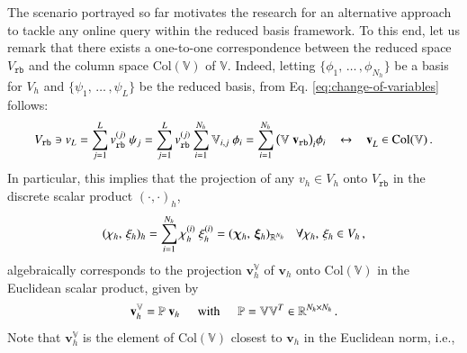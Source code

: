 \documentclass[longtitle]{elsarticle}
\numberwithin{equation}{section}
\theoremstyle{theorem}
\theoremstyle{definition}
\theoremstyle{remark}
\theoremstyle{proposition}
\numberwithin{figure}{section}
\newcommand{\bg}[1]{\boldsymbol{#1}}
\begin{document}
		The scenario portrayed so far motivates the research for an alternative approach to tackle any online query within the reduced basis framework. To this end, let us remark that there exists a one-to-one correspondence between the reduced space $V_{\texttt{rb}}$ and the column space $\text{Col}(\mathbb{V})$ of $\mathbb{V}$. Indeed, letting $\big\lbrace \phi_1, \, \ldots \, , \phi_{N_h} \big\rbrace$ be a basis for $V_h$ and $\big\lbrace \psi_1, \, \ldots \, , \psi_L \big\rbrace$ be the reduced basis, from Eq. \eqref{eq:change-of-variables} follows:
		\begin{equation*}
			V_{\texttt{rb}} \ni v_{L} = \sum_{j = 1}^L v_{\texttt{rb}}^{(j)} ~ \psi_j = \sum_{j = 1}^L v_{\texttt{rb}}^{(j)} \sum_{i = 1}^{N_h} \mathbb{V}_{i,j} ~ \phi_i = \sum_{i = 1}^{N_h} \big( \mathbb{V} ~ \mathbf{v}_{\texttt{rb}} \big)_i \phi_i \hspace*{0.3cm} \leftrightarrow \hspace*{0.3cm} \mathbf{v}_L^{} \in \text{Col}(\mathbb{V}) \, .
		\end{equation*}
		In particular, this implies that the projection of any $v_h \in V_h$ onto $V_{\texttt{rb}}$ in the discrete scalar product $(\cdot,\cdot)_h$, 
		\begin{equation}
			\label{eq:discrete-scalar-product}
			(\chi_h, \, \xi_h)_h = \sum_{i = 1}^{N_h} \chi_h^{(i)} ~ \xi_h^{(i)} = (\bg{\chi}_h, \, \bg{\xi}_h)_{\mathbb{R}^{N_h}} \hspace*{0.3cm} \text{$\forall \chi_h, \, \xi_h \in V_h$} \, , 
		\end{equation}
		algebraically corresponds to the projection $\mathbf{v}_h^{\mathbb{V}}$ of $\mathbf{v}_h$ onto $\text{Col}(\mathbb{V})$ in the Euclidean scalar product, given by
		\begin{equation*}
			\mathbf{v}_h^{\mathbb{V}} = \mathbb{P} ~ \mathbf{v}_h \hspace*{0.5cm} \text{with} \hspace*{0.5cm} \mathbb{P} = \mathbb{V} \mathbb{V}^T \in \mathbb{R}^{{N_h} \times {N_h}} \, .
		\end{equation*}
		Note that $\mathbf{v}_h^{\mathbb{V}}$ is the element of $\text{Col}(\mathbb{V})$ closest to $\mathbf{v}_h$ in the Euclidean norm, i.e.,
\end{document}
